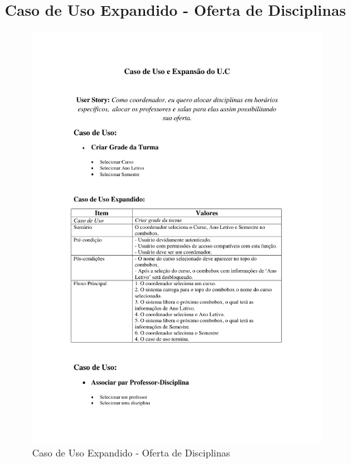 \documentclass{abnt}
\begin{document}
			\subsection{Caso de Uso Expandido - Oferta de Disciplinas}
		\begin{figure}[h]
			\begin{center}
				\includegraphics[bb=1.0in 1.0in 7.5in 10in page=1]{ExpansaoU_C_OfertaDisciplinas.pdf}
				 \caption{Caso de Uso Expandido - Oferta de Disciplinas}
			\end{center}
		\end{figure}
\end{document}
